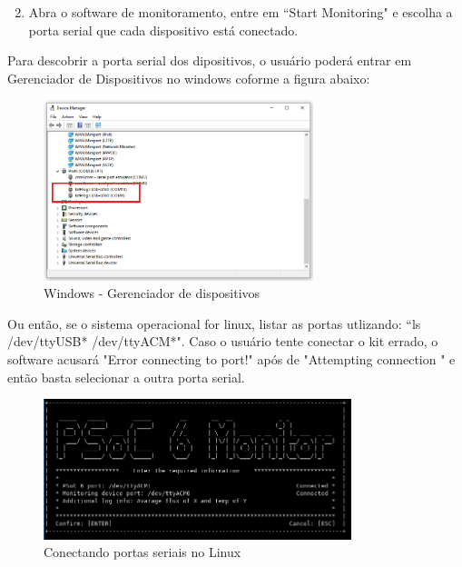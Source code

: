 \documentclass[12pt, a4paper]{article}
\begin{document}
\begin{enumerate}[leftmargin=1.3cm]
    \setcounter{enumi}{1}
    \item  Abra o software de monitoramento, entre em ``Start Monitoring" e escolha a porta serial que cada dispositivo está conectado.
\end{enumerate}

Para descobrir a porta serial dos dipositivos, o usuário poderá entrar em Gerenciador de Dispositivos no windows coforme a figura abaixo:

\begin{figure}[H]
    \centering
    \caption{Windows - Gerenciador de dispositivos}
    \includegraphics[width=0.7\textwidth]{../imgs/device_manager.png}

    \vspace{0.5em}
    \label{fig:device_manager}
\end{figure}

Ou então, se o sistema operacional for linux, listar as portas utlizando: ``ls /dev/ttyUSB* /dev/ttyACM*". Caso o usuário tente conectar o kit errado, o software acusará "Error connecting to port!" após de "Attempting connection " e então basta selecionar a outra porta serial.

\begin{figure}[H]
    \centering
    \caption{Conectando portas seriais no Linux}
    \includegraphics[width=0.8\textwidth]{../imgs/serial_linux.png}

    \vspace{0.5em}
    \label{fig:serial_linux}
\end{figure}
\end{document}
